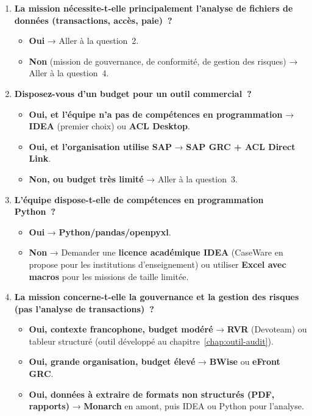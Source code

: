 \begin{enumerate}

  \item \textbf{La mission nécessite-t-elle principalement l'analyse de
        fichiers de données (transactions, accès, paie)~?}
  \begin{itemize}
    \item \textbf{Oui} → Aller à la question~2.
    \item \textbf{Non} (mission de gouvernance, de conformité, de
          gestion des risques) → Aller à la question~4.
  \end{itemize}

  \item \textbf{Disposez-vous d'un budget pour un outil commercial~?}
  \begin{itemize}
    \item \textbf{Oui, et l'équipe n'a pas de compétences en programmation}
          → \textbf{IDEA} (premier choix) ou \textbf{ACL Desktop}.
    \item \textbf{Oui, et l'organisation utilise SAP}
          → \textbf{SAP GRC + ACL Direct Link}.
    \item \textbf{Non, ou budget très limité} → Aller à la question~3.
  \end{itemize}

  \item \textbf{L'équipe dispose-t-elle de compétences en programmation
        Python~?}
  \begin{itemize}
    \item \textbf{Oui} → \textbf{Python/pandas/openpyxl}.
    \item \textbf{Non} → Demander une \textbf{licence académique IDEA}
          (CaseWare en propose pour les institutions d'enseignement)
          ou utiliser \textbf{Excel avec macros} pour les missions de
          taille limitée.
  \end{itemize}

  \item \textbf{La mission concerne-t-elle la gouvernance et la gestion
        des risques (pas l'analyse de transactions)~?}
  \begin{itemize}
    \item \textbf{Oui, contexte francophone, budget modéré}
          → \textbf{RVR} (Devoteam) ou tableur structuré (outil
          développé au chapitre~\ref{chap:outil-audit}).
    \item \textbf{Oui, grande organisation, budget élevé}
          → \textbf{BWise} ou \textbf{eFront GRC}.
    \item \textbf{Oui, données à extraire de formats non structurés
          (PDF, rapports)} → \textbf{Monarch} en amont, puis IDEA ou
          Python pour l'analyse.
  \end{itemize}

\end{enumerate}

